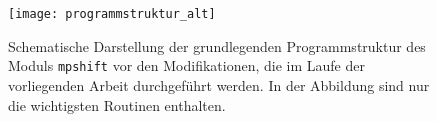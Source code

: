\newpage
\begin{figure}[ht!]
\centering
\texttt{[image: programmstruktur\_alt]}
\captionsetup{figurewithin = chapter}
\captionsetup{font=small, labelfont=bf}\caption[Grundlegende Programmstruktur]{Schematische Darstellung der grundlegenden Programmstruktur des Moduls \texttt{mpshift} vor den Modifikationen, die im Laufe der vorliegenden Arbeit durchgeführt werden. In der Abbildung sind nur die wichtigsten Routinen enthalten.}
\label{abb:programmstrukur_alt}
\end{figure}
